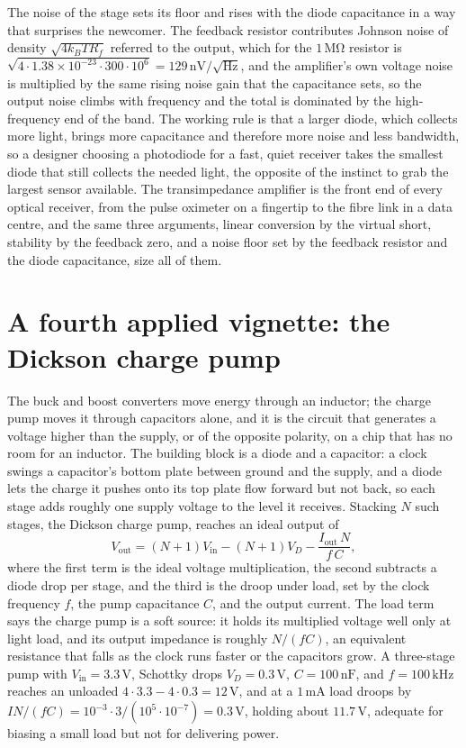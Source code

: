 The noise of the stage sets its floor and rises with the diode capacitance in a
way that surprises the newcomer. The feedback resistor contributes Johnson noise
of density $\sqrt{4k_B T R_f}$ referred to the output, which for the
$1\,\si{\mega\ohm}$ resistor is $\sqrt{4\cdot 1.38\times 10^{-23}\cdot 300\cdot
10^{6}} = 129\,\si{\nano\volt}/\sqrt{\si{\hertz}}$, and the amplifier's own
voltage noise is multiplied by the same rising noise gain that the capacitance
sets, so the output noise climbs with frequency and the total is dominated by
the high-frequency end of the band. The working rule is that a larger diode,
which collects more light, brings more capacitance and therefore more noise and
less bandwidth, so a designer choosing a photodiode for a fast, quiet receiver
takes the smallest diode that still collects the needed light, the opposite of
the instinct to grab the largest sensor available. The transimpedance amplifier
is the front end of every optical receiver, from the pulse oximeter on a
fingertip to the fibre link in a data centre, and the same three arguments,
linear conversion by the virtual short, stability by the feedback zero, and a
noise floor set by the feedback resistor and the diode capacitance, size all of
them.

\section{A fourth applied vignette: the Dickson charge pump}
\label{sec:vol04ch09:charge-pump}

The buck and boost converters move energy through an inductor; the charge pump
moves it through capacitors alone, and it is the circuit that generates a voltage
higher than the supply, or of the opposite polarity, on a chip that has no room
for an inductor. The building block is a diode and a capacitor: a clock swings a
capacitor's bottom plate between ground and the supply, and a diode lets the
charge it pushes onto its top plate flow forward but not back, so each stage adds
roughly one supply voltage to the level it receives. Stacking $N$ such stages,
the Dickson charge pump, reaches an ideal output of
\[
V_{\text{out}} = (N + 1)V_{\text{in}} - (N + 1)V_D - \frac{I_{\text{out}}\,N}
{f\,C},
\]
where the first term is the ideal voltage multiplication, the second subtracts a
diode drop per stage, and the third is the droop under load, set by the clock
frequency $f$, the pump capacitance $C$, and the output current. The load term
says the charge pump is a soft source: it holds its multiplied voltage well only
at light load, and its output impedance is roughly $N/(fC)$, an equivalent
resistance that falls as the clock runs faster or the capacitors grow. A
three-stage pump with $V_{\text{in}} = 3.3\,\si{\volt}$, Schottky drops $V_D =
0.3\,\si{\volt}$, $C = 100\,\si{\nano\farad}$, and $f = 100\,\si{\kilo\hertz}$
reaches an unloaded $4\cdot 3.3 - 4\cdot 0.3 = 12\,\si{\volt}$, and at a
$1\,\si{\milli\ampere}$ load droops by $I N/(fC) = 10^{-3}\cdot 3/(10^{5}\cdot
10^{-7}) = 0.3\,\si{\volt}$, holding about $11.7\,\si{\volt}$, adequate for
biasing a small load but not for delivering power.

